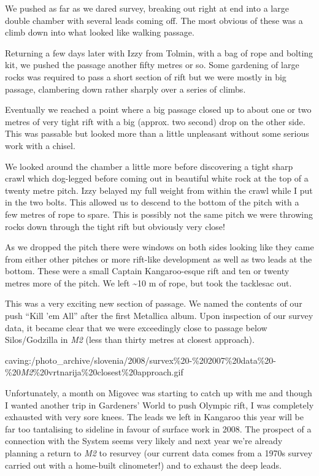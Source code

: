 We pushed as far as we dared survey, breaking out right at end into a
large double chamber with several leads coming off. The most obvious of
these was a climb down into what looked like walking passage.

Returning a few days later with Izzy from Tolmin, with a bag of rope and
bolting kit, we pushed the passage another fifty metres or so. Some
gardening of large rocks was required to pass a short section of rift
but we were mostly in big passage, clambering down rather sharply over a
series of climbs.

Eventually we reached a point where a big passage closed up to about one
or two metres of very tight rift with a big (approx. two second) drop on
the other side. This was passable but looked more than a little
unpleasant without some serious work with a chisel.

We looked around the chamber a little more before discovering a tight
sharp crawl which dog-legged before coming out in beautiful white rock
at the top of a twenty metre pitch. Izzy belayed my full weight from
within the crawl while I put in the two bolts. This allowed us to
descend to the bottom of the pitch with a few metres of rope to spare.
This is possibly not the same pitch we were throwing rocks down through
the tight rift but obviously very close!

As we dropped the pitch there were windows on both sides looking like
they came from either other pitches or more rift-like development as
well as two leads at the bottom. These were a small Captain
Kangaroo-esque rift and ten or twenty metres more of the pitch. We left
\textasciitilde{}10 m of rope, but took the tacklesac out.

This was a very exciting new section of passage. We named the contents
of our push ``Kill 'em All'' after the first Metallica album. Upon
inspection of our survey data, it became clear that we were exceedingly
close to passage below Silos/Godzilla in \emph{M2} (less than thirty
metres at closest approach).

caving:/photo\_archive/slovenia/2008/survex\%20-\%202007\%20data\%20-\%20\emph{M2}\%20vrtnarija\%20closest\%20approach.gif

Unfortunately, a month on Migovec was starting to catch up with me and
though I wanted another trip in Gardeners' World to push Olympic rift, I
was completely exhausted with very sore knees. The leads we left in
Kangaroo this year will be far too tantalising to sideline in favour of
surface work in 2008. The prospect of a connection with the System seems
very likely and next year we're already planning a return to \emph{M2}
to resurvey (our current data comes from a 1970s survey carried out with
a home-built clinometer!) and to exhaust the deep leads.

